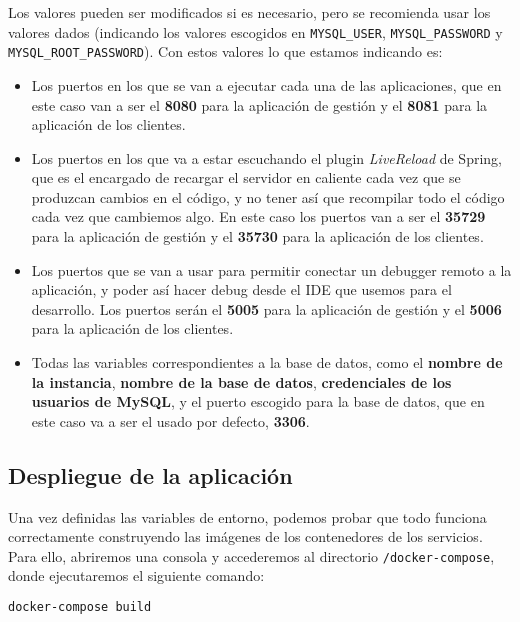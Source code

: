 Los valores pueden ser modificados si es necesario, pero se recomienda usar los valores dados (indicando los valores escogidos en \verb,MYSQL_USER,, \verb,MYSQL_PASSWORD, y \verb,MYSQL_ROOT_PASSWORD,). Con estos valores lo que estamos indicando es:

\begin{itemize}
	\item Los puertos en los que se van a ejecutar cada una de las aplicaciones, que en este caso van a ser el \textbf{8080} para la aplicación de gestión y el \textbf{8081} para la aplicación de los clientes.
	\item Los puertos en los que va a estar escuchando el plugin \textit{LiveReload} de Spring, que es el encargado de recargar el servidor en caliente cada vez que se produzcan cambios en el código, y no tener así que recompilar todo el código cada vez que cambiemos algo. En este caso los puertos van a ser el \textbf{35729} para la aplicación de gestión y el \textbf{35730} para la aplicación de los clientes.
	\item Los puertos que se van a usar para permitir conectar un debugger remoto a la aplicación, y poder así hacer debug desde el IDE que usemos para el desarrollo. Los puertos serán el \textbf{5005} para la aplicación de gestión y el \textbf{5006} para la aplicación de los clientes.
	\item Todas las variables correspondientes a la base de datos, como el \textbf{nombre de la instancia}, \textbf{nombre de la base de datos}, \textbf{credenciales de los usuarios de MySQL}, y el puerto escogido para la base de datos, que en este caso va a ser el usado por defecto, \textbf{3306}. 
\end{itemize}

\subsection{Despliegue de la aplicación}


Una vez definidas las variables de entorno, podemos probar que todo funciona correctamente construyendo las imágenes de los contenedores de los servicios. Para ello, abriremos una consola y accederemos al directorio \verb,/docker-compose,, donde ejecutaremos el siguiente comando:

\begin{lstlisting}[language=Bash]
docker-compose build
\end{lstlisting}

